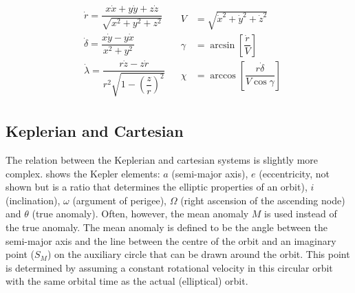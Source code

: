 %
%

\begin{align} \label{eq:carttospherv}
\begin{split}
& \dot{r}=\dfrac{x\dot{x}+y\dot{y}+z\dot{z}}{\sqrt{x^{2}+y^{2}+z^{2}}}\\
& \dot{\delta}=\dfrac{x\dot{y}-y\dot{x}}{x^{2}+y^{2}}\\
& \dot{\lambda}=\dfrac{r\dot{z}-z\dot{r}}{r^{2}\sqrt{1-\left(\dfrac{z}{r}\right)^{2}}}
\end{split}
&
\begin{split}
V&=\sqrt{\dot{x}^{2}+\dot{y}^{2}+\dot{z}^{2}}\\
\gamma&=\arcsin\left[\dfrac{\dot{r}}{V}\right]\\
\chi&=\arccos\left[\dfrac{r \dot{\delta}}{V\cos\gamma }\right]
\end{split}
\end{align}


\subsection{Keplerian and Cartesian}
\label{subsec:keplcart}
The relation between the Keplerian and cartesian systems is slightly more complex.  shows the Kepler elements: $a$ (semi-major axis), $e$ (eccentricity, not shown but is a ratio that determines the elliptic properties of an orbit), $i$ (inclination), $\omega$ (argument of perigee), $\Omega$ (right ascension of the ascending node) and $\theta$ (true anomaly). Often, however, the mean anomaly $M$ is used instead of the true anomaly. The mean anomaly is defined to be the angle between the semi-major axis and the line between the centre of the orbit and an imaginary point ($S_{M}$) on the auxiliary circle that can be drawn around the orbit. This point is determined by assuming a constant rotational velocity in this circular orbit with the same orbital time as the actual (elliptical) orbit. 


